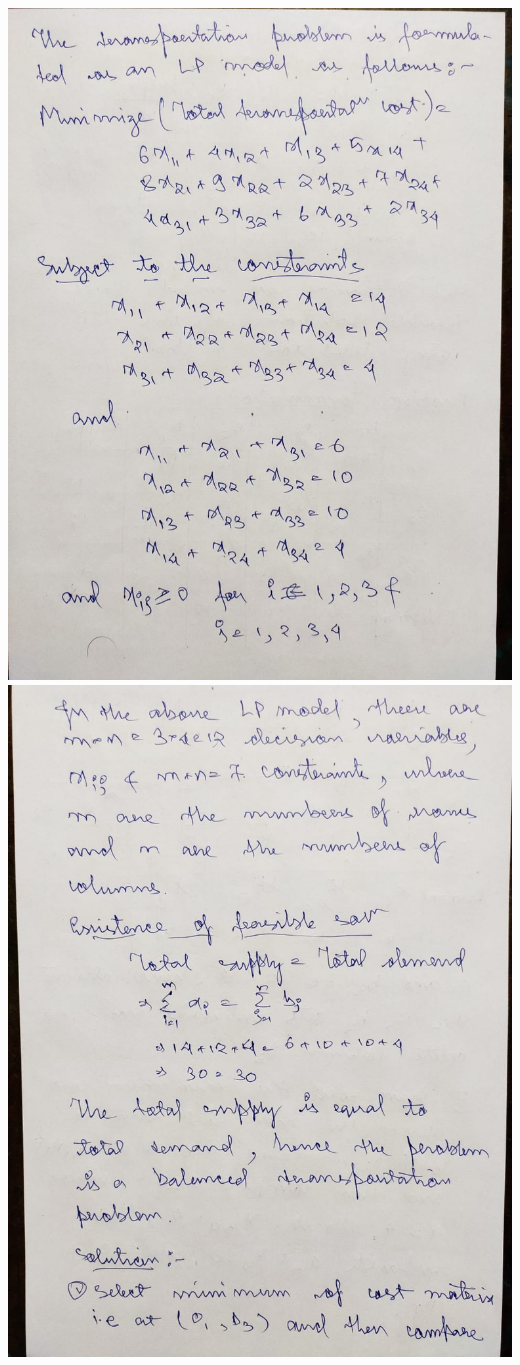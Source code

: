 \documentclass[12pt, letterpaper, twoside]{book}
\begin{document}
\includegraphics[width=\paperwidth, height=\paperheight]{Page2}
\includegraphics[width=\paperwidth, height=\paperheight]{Page3}
\end{document}
